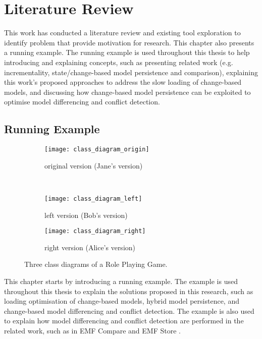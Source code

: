\chapter{Literature Review}
\label{ch:literature_review}
This work has conducted a literature review and existing tool exploration to 
identify problem that provide motivation for research. This chapter also presents a running example. The running example is used throughout this thesis to help introducing and explaining concepts, such as presenting related work (e.g. incrementality, state/change-based model persistence and comparison), explaining this work's proposed approaches to address the slow loading of change-based models, and discussing how change-based model persistence can be exploited to optimise model differencing and conflict detection.

\section{Running Example}
\label{sec:running_example_1}

\begin{figure}[ht]
  \centering
  \begin{subfigure}[t]{0.45\linewidth}
    \texttt{[image: class\_diagram\_origin]}
    \caption{original version (Jane's version)}
    \label{fig:class_diagram_origin}
  \end{subfigure}
  \\
  \begin{subfigure}[t]{0.45\linewidth}
    \texttt{[image: class\_diagram\_left]}
    \caption{left version (Bob's version)}
    \label{fig:class_diagram_left}
  \end{subfigure}
  \hfill
  \begin{subfigure}[t]{0.45\linewidth}
    \texttt{[image: class\_diagram\_right]}
    \caption{right version (Alice's version)}
    \label{fig:class_diagram_right}
  \end{subfigure}
  \caption{Three class diagrams of a Role Playing Game.}
  \label{fig:class_diagram_rpg}
\end{figure}

This chapter starts by introducing a running example. The example is used throughout this thesis to explain the solutions proposed in this research, such as loading optimisation of change-based models, hybrid model persistence, and change-based model differencing and conflict detection. The example is also used to explain how model differencing and conflict detection are performed in the related work, such as in EMF Compare \cite{emfcompare2018developer} and EMF Store \cite{emfstore2019what}. 

